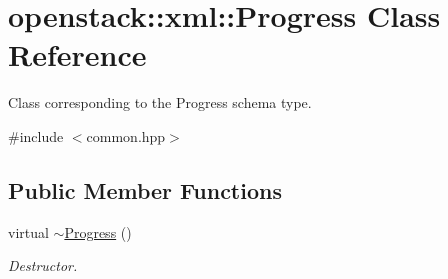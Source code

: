 \hypertarget{classopenstack_1_1xml_1_1Progress}{
\section{openstack::xml::Progress Class Reference}
\label{classopenstack_1_1xml_1_1Progress}
}


Class corresponding to the Progress schema type.  




{\ttfamily \#include $<$common.hpp$>$}

\subsection*{Public Member Functions}
\begin{DoxyCompactItemize}
\item 
\hypertarget{classopenstack_1_1xml_1_1Progress_a9b1680dd93a49e7e1db2d8a7fd4eb846}{
virtual \hyperlink{classopenstack_1_1xml_1_1Progress_a9b1680dd93a49e7e1db2d8a7fd4eb846}{$\sim$Progress} ()}
\label{classopenstack_1_1xml_1_1Progress_a9b1680dd93a49e7e1db2d8a7fd4eb846}

\begin{DoxyCompactList}\small\item\em Destructor. \item\end{DoxyCompactList}\end{DoxyCompactItemize}
